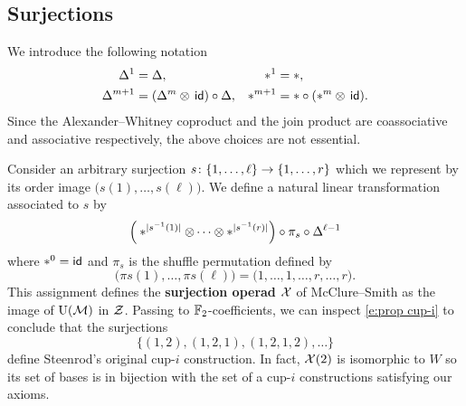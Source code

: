 
\subsection{Surjections}

We introduce the following notation
\begin{align*}
	\Delta^1 &= \Delta, &
	\ast^1 &= \ast, \\
	\Delta^{m+1} &= (\Delta^m \otimes \, \mathsf{id}) \circ \Delta, &
	\ast^{m+1} &= \ast \circ (\ast^m \otimes \, \mathsf{id}).
\end{align*}
Since the Alexander--Whitney coproduct and the join product are coassociative and associative respectively, the above choices are not essential.

Consider an arbitrary surjection $s \colon \{1,\dots,\ell\} \to \{1,\dots,r\}$ which we represent by its order image $\big(s(1),\dots,s(\ell)\big)$.
We define a natural linear transformation associated to $s$ by
\begin{equation}\label{e:surjection action}
	\Big( \ast^{\lvert s^{-1}(1)\rvert} \otimes \dotsb \otimes \ast^{\lvert s^{-1}(r)\rvert} \Big) \circ \pi_s \circ \Delta^{\ell-1}
\end{equation}
where $\ast^0 = \mathsf{id}$ and $\pi_s$ is the shuffle permutation defined by
\[
\big( \pi s(1), \dots, \pi s(\ell) \big) =
\big( 1, \dots, 1, \dots, r, \dots, r \big).
\]
This assignment defines the \textbf{surjection operad} $\mathcal{X}$ of McClure--Smith \cite{mcclure2003multivariable} as the image of $\operatorname{U}(\mathcal{M})$ in $\mathcal{Z}$.
Passing to ${\mathbb{F}_2}$-coefficients, we can inspect \cref{e:prop cup-i} to conclude that the surjections
\[
\big\{ (1,2), (1,2,1), (1,2,1,2), \dots \big\}
\]
define Steenrod's original \mbox{cup-$i$} construction.
In fact, $\mathcal{X}(2)$ is isomorphic to $W$ so its set of bases is in bijection with the set of a \mbox{cup-$i$} constructions satisfying our axioms.

